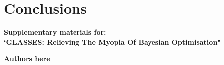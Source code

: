 \documentclass[twoside]{article}
\begin{document}


\section{Conclusions}\label{sec:conclusions}




\newpage
\clearpage
\setcounter{section}{0}
\setcounter{equation}{0}
\renewcommand{\thesection}{S\arabic{section}}
\renewcommand{\theequation}{S.\arabic{equation}}
\onecolumn
\begin{center}
{\Large  \textbf{Supplementary materials for:\\
`GLASSES: Relieving The Myopia Of Bayesian Optimisation"}}
\end{center}
\begin{center}
\textbf{Authors here}
\end{center}
\end{document}
